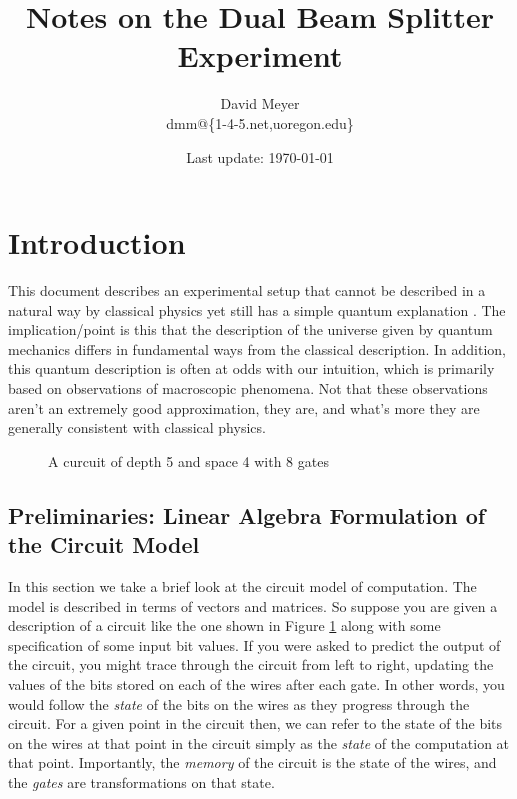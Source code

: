 \documentclass[11pt, oneside]{article}   	%
\title{Notes on the Dual Beam Splitter Experiment}
\author{David Meyer \\ dmm@\{1-4-5.net,uoregon.edu\}}
\date{Last update: \today}							%
\begin{document}
\maketitle

\section{Introduction}
This document describes an experimental setup that cannot be described in a natural way by classical physics yet still  has a simple quantum explanation \cite{Aharonov:aa, Henault:2015aa}. The implication/point is this that the description of the universe given by quantum mechanics differs in fundamental ways from the classical description. In addition, this quantum description is often at odds with our intuition, which is primarily based on observations of macroscopic phenomena. Not that these observations aren't an extremely good approximation, they are, and what's more they are generally consistent with classical physics. 

\begin{figure}
\caption{A curcuit of depth 5 and space 4 with 8 gates}
\label{fig:circuit}
\end{figure}


\subsection{Preliminaries: Linear Algebra Formulation of the Circuit Model}

In this section we take a brief look at the circuit model of computation. The model is described in terms of vectors and matrices.  So suppose you are given a description of a circuit like the one shown in Figure \ref{fig:circuit} along with some specification of some input bit values. If you were asked to predict the output of the circuit,  you might trace through the circuit from left to right, updating the values of the bits stored on each of the wires after each gate. In other words, you would follow the \emph{state} of the bits on the wires as they progress through the circuit. For a given point in the circuit then, we can refer to the state of the bits on the wires at that point in the circuit simply as the \emph{state} of the computation at that point. Importantly, the \emph{memory} of the circuit is the state of the wires, and the \emph{gates} are transformations on that state. 
\end{document}
